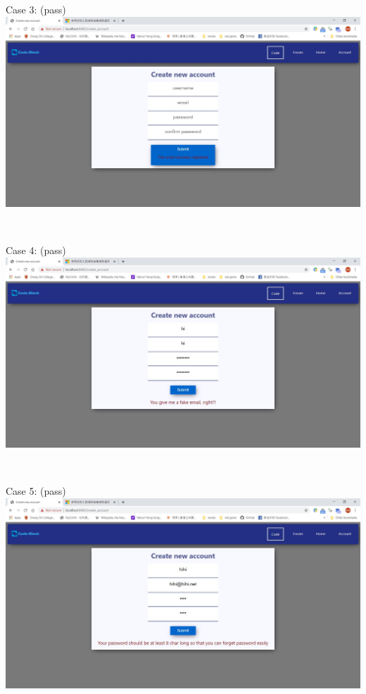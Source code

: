 Case 3: (pass)\\
\includegraphics[scale=0.45]{Doc/Pics/case-5-1-3}

~

Case 4: (pass)\\
\includegraphics[scale=0.45]{Doc/Pics/case-5-1-4}

~

Case 5: (pass)\\
\includegraphics[scale=0.45]{Doc/Pics/case-5-1-5}

~

